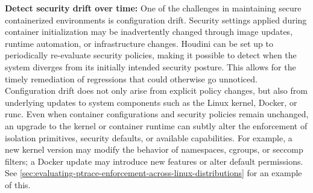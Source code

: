 \begin{doublespace}
\noindent\textbf{Detect security drift over time:} One of the challenges in maintaining secure containerized environments is configuration drift. Security settings applied during container initialization may be inadvertently changed through image updates, runtime automation, or infrastructure changes. Houdini can be set up to periodically re-evaluate security policies, making it possible to detect when the system diverges from its initially intended security posture. This allows for the timely remediation of regressions that could otherwise go unnoticed. Configuration drift does not only arise from explicit policy changes, but also from underlying updates to system components such as the Linux kernel, Docker, or runc. Even when container configurations and security policies remain unchanged, an upgrade to the kernel or container runtime can subtly alter the enforcement of isolation primitives, security defaults, or available capabilities. For example, a new kernel version may modify the behavior of namespaces, cgroups, or seccomp filters; a Docker update may introduce new features or alter default permissions. See \ref{sec:evaluating-ptrace-enforcement-across-linux-distributions} for an example of this.
\end{doublespace}